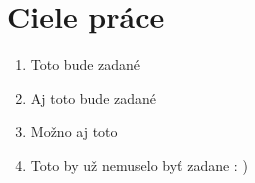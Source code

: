 \section{Ciele práce}

\begin{enumerate}
	\item Toto bude zadané
	\item Aj toto bude zadané
	\item Možno aj toto
	\item Toto by už nemuselo byť zadane : )
\end{enumerate}
